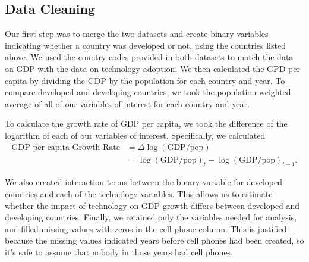 \documentclass[11pt]{texMemo}
\begin{document}
\subsection{Data Cleaning}
Our first step was to merge the two datasets and create binary variables indicating whether a country was developed or not, using the countries listed above.
We used the country codes provided in both datasets to match the data on GDP with the data on technology adoption.
We then calculated the GPD per capita by dividing the GDP by the population for each country and year.
To compare developed and developing countries, we took the population-weighted average of all of our variables of interest for each country and year.

To calculate the growth rate of GDP per capita, we took the difference of the logarithm of each of our variables of interest.
Specifically, we calculated
\begin{align*}
    \text{GDP per capita Growth Rate} &= \Delta \log(\text{GDP}/\text{pop}) \\
    &= \log(\text{GDP}/\text{pop})_t - \log(\text{GDP}/\text{pop})_{t-1}.
\end{align*}

We also created interaction terms between the binary variable for developed countries and each of the technology variables. This allows us to estimate whether the impact of technology on GDP growth differs between developed and developing countries. 
Finally, we retained only the variables needed for analysis, and filled missing values with zeros in the cell phone column.
This is justified because the missing values indicated years before cell phones had been created, so it's safe to assume that nobody in those years had cell phones.
\end{document}
